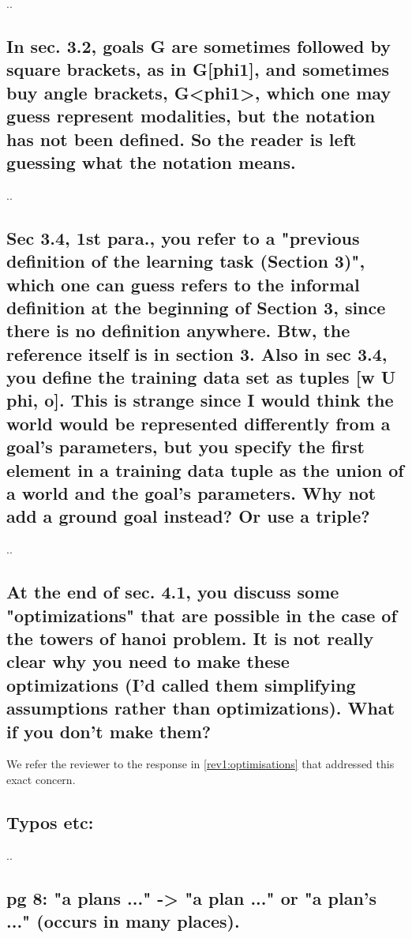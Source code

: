 \documentclass[preprint,12pt]{elsarticle}
\begin{document}
..

\subsection{ In sec. 3.2, goals G are sometimes followed by square brackets, as in
G[phi1], and sometimes buy angle brackets, G<phi1>, which one may
guess represent modalities, but the notation has not been defined. So
the reader is left guessing what the notation means.}

..

\subsection{ Sec 3.4, 1st para., you refer to a "previous definition of the
learning task (Section 3)", which one can guess refers to the informal
definition at the beginning of Section 3, since there is no definition
anywhere. Btw, the reference itself is in section 3.
Also in sec 3.4, you define the training data set as tuples
[w U phi, o]. This is strange since I would think the world would be
represented differently from a goal's parameters, but you specify the
first element in a training data tuple as the union of a world and
the goal's parameters. Why not add a ground goal instead? Or use a
triple?}

..

\subsection{ At the end of sec. 4.1, you discuss some "optimizations" that are
possible in the case of the towers of hanoi problem. It is not really
clear why you need to make these optimizations (I'd called them
simplifying assumptions rather than optimizations). What if you don't
make them?}

We refer the reviewer to the response in \ref{rev1:optimisations} that addressed this exact concern.

\subsection{ Typos etc:}

..

\subsection{ pg 8: "a plans ..." -> "a plan ..." or "a plan's ..." (occurs in many places).}
\end{document}
